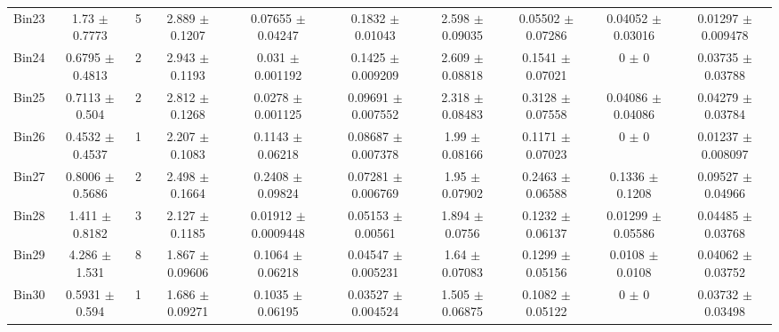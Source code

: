 \begin{tabular}{@{\extracolsep{4pt}}lccccccccc@{}}
     Bin23 & 1.73 $\pm$ 0.7773 & 5 & 2.889 $\pm$ 0.1207 & 0.07655 $\pm$ 0.04247 & 0.1832 $\pm$ 0.01043 & 2.598 $\pm$ 0.09035 & 0.05502 $\pm$ 0.07286 & 0.04052 $\pm$ 0.03016 & 0.01297 $\pm$ 0.009478 \\ 
     Bin24 & 0.6795 $\pm$ 0.4813 & 2 & 2.943 $\pm$ 0.1193 & 0.031 $\pm$ 0.001192 & 0.1425 $\pm$ 0.009209 & 2.609 $\pm$ 0.08818 & 0.1541 $\pm$ 0.07021 & 0 $\pm$ 0 & 0.03735 $\pm$ 0.03788 \\ 
     Bin25 & 0.7113 $\pm$ 0.504 & 2 & 2.812 $\pm$ 0.1268 & 0.0278 $\pm$ 0.001125 & 0.09691 $\pm$ 0.007552 & 2.318 $\pm$ 0.08483 & 0.3128 $\pm$ 0.07558 & 0.04086 $\pm$ 0.04086 & 0.04279 $\pm$ 0.03784 \\ 
     Bin26 & 0.4532 $\pm$ 0.4537 & 1 & 2.207 $\pm$ 0.1083 & 0.1143 $\pm$ 0.06218 & 0.08687 $\pm$ 0.007378 & 1.99 $\pm$ 0.08166 & 0.1171 $\pm$ 0.07023 & 0 $\pm$ 0 & 0.01237 $\pm$ 0.008097 \\ 
     Bin27 & 0.8006 $\pm$ 0.5686 & 2 & 2.498 $\pm$ 0.1664 & 0.2408 $\pm$ 0.09824 & 0.07281 $\pm$ 0.006769 & 1.95 $\pm$ 0.07902 & 0.2463 $\pm$ 0.06588 & 0.1336 $\pm$ 0.1208 & 0.09527 $\pm$ 0.04966 \\ 
     Bin28 & 1.411 $\pm$ 0.8182 & 3 & 2.127 $\pm$ 0.1185 & 0.01912 $\pm$ 0.0009448 & 0.05153 $\pm$ 0.00561 & 1.894 $\pm$ 0.0756 & 0.1232 $\pm$ 0.06137 & 0.01299 $\pm$ 0.05586 & 0.04485 $\pm$ 0.03768 \\ 
     Bin29 & 4.286 $\pm$ 1.531 & 8 & 1.867 $\pm$ 0.09606 & 0.1064 $\pm$ 0.06218 & 0.04547 $\pm$ 0.005231 & 1.64 $\pm$ 0.07083 & 0.1299 $\pm$ 0.05156 & 0.0108 $\pm$ 0.0108 & 0.04062 $\pm$ 0.03752 \\ 
     Bin30 & 0.5931 $\pm$ 0.594 & 1 & 1.686 $\pm$ 0.09271 & 0.1035 $\pm$ 0.06195 & 0.03527 $\pm$ 0.004524 & 1.505 $\pm$ 0.06875 & 0.1082 $\pm$ 0.05122 & 0 $\pm$ 0 & 0.03732 $\pm$ 0.03498 \\ 
\hline\hline
  \end{tabular}
